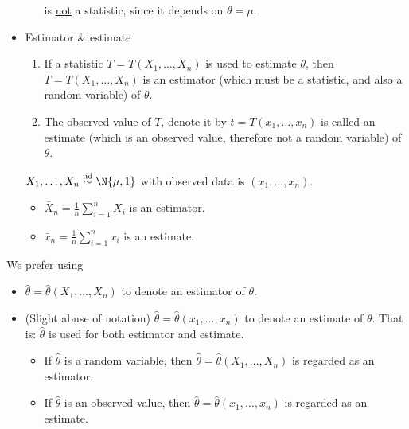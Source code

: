 \begin{itemize}
\begin{Example}{}{}
\begin{itemize}
                        is \underline{not} a statistic, since it depends
                        on $ \theta=\mu $.
              \end{itemize}
          \end{Example}
    \item Estimator \& estimate
          \begin{enumerate}
              \item If a statistic $ T=T(X_1,\ldots,X_n) $
                    is used to estimate $ \theta $, then
                    $ T=T(X_1,\ldots,X_n) $ is an
                    estimator (which must be a statistic,
                    and also a random variable) of $ \theta $.
              \item The observed value of $ T $,
                    denote it by $ t=T(x_1,\ldots,x_n) $
                    is called an estimate (which
                    is an observed value, therefore not a random variable)
                    of $ \theta $.
          \end{enumerate}
          \begin{Example}{}{}
              $ X_1,\ldots,X_n \stackrel{\text{iid}}{\sim}\N{\mu,1} $
              with observed data is $ (x_1,\ldots,x_n) $.
              \begin{itemize}
                  \item $ \displaystyle \bar{X}_n=\frac{1}{n} \sum_{i=1}^{n} X_i $
                        is an estimator.
                  \item $ \displaystyle \bar{x}_n=\frac{1}{n} \sum_{i=1}^{n} x_i $
                        is an estimate.
              \end{itemize}
          \end{Example}
\end{itemize}
\begin{Remark}{}{}
    We prefer using
    \begin{itemize}
        \item $ \hat{\theta}=\hat{\theta}(X_1,\ldots,X_n) $
              to denote an estimator of $ \theta $.
        \item (Slight abuse of notation)
              $ \hat{\theta}=\hat{\theta}(x_1,\ldots,x_n) $
              to denote an estimate of $ \theta $. That is:
              $ \hat{\theta} $ is used for both estimator and estimate.
              \begin{itemize}
                  \item If $ \hat{\theta} $ is a random variable, then
                        $ \hat{\theta}=\hat{\theta}(X_1,\ldots,X_n) $
                        is regarded as an estimator.
                  \item If $ \hat{\theta} $ is an observed value, then
                        $ \hat{\theta}=\hat{\theta}(x_1,\ldots,x_n) $
                        is regarded as an estimate.
              \end{itemize}
    \end{itemize}
\end{Remark}
